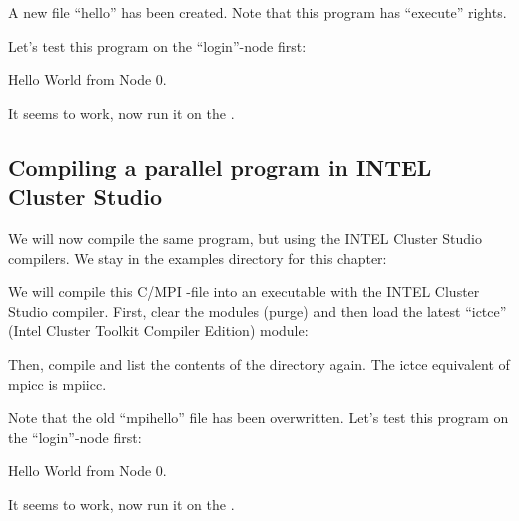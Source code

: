 A new file ``hello'' has been created. Note that this program has ``execute''
rights.

Let's test this program on the ``login''-node first:

\begin{prompt}
Hello World from Node 0.
\end{prompt}

It seems to work, now run it on the \hpc.

\begin{prompt}
\end{prompt}

\subsection{Compiling a parallel program in INTEL Cluster Studio}

We will now compile the same program, but using the INTEL Cluster Studio
compilers. We stay in the examples directory for this chapter:

\begin{prompt}
\end{prompt}

We will compile this C/MPI -file into an executable with the INTEL Cluster
Studio compiler. First, clear the modules (purge) and then load the latest
``ictce'' (Intel Cluster Toolkit Compiler Edition) module:

\begin{prompt}
\end{prompt}

Then, compile and list the contents of the directory again. The ictce
equivalent of mpicc is mpiicc.

\begin{prompt}
\end{prompt}

Note that the old ``mpihello'' file has been overwritten.
Let's test this program on the ``login''-node first:

\begin{prompt}
Hello World from Node 0.
\end{prompt}

It seems to work, now run it on the \hpc.

\begin{prompt}
\end{prompt}


